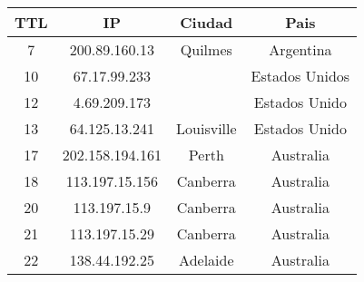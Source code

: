 \begin{tabular}{|c|c|c|c|}
	\hline
	TTL & IP & Ciudad & Pais \\
	\hline
	7 & 200.89.160.13 & Quilmes & Argentina \\
	\hline
	10 & 67.17.99.233 &  & Estados Unidos \\
	\hline
	12 & 4.69.209.173 &  & Estados Unido \\
	\hline
	13 & 64.125.13.241 & Louisville & Estados Unido \\
	\hline
	17 & 202.158.194.161 & Perth & Australia \\
	\hline
	18 & 113.197.15.156 & Canberra & Australia \\
	\hline
	20 & 113.197.15.9 & Canberra & Australia \\
	\hline
	21 & 113.197.15.29 & Canberra & Australia \\
	\hline
	22 & 138.44.192.25 & Adelaide & Australia \\
	\hline
\end{tabular}
